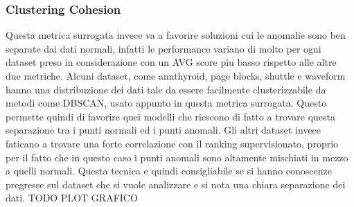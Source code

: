 \subsubsection{Clustering Cohesion}
Questa metrica surrogata invece va a favorire soluzioni cui le anomalie sono ben separate dai dati normali, infatti le performance variano di molto per ogni dataset preso in considerazione con un AVG score piu basso rispetto alle altre due metriche.
Alcuni dataset, come annthyroid, page blocks, shuttle e waveform hanno una distribuzione dei dati tale da essere facilmente clusterizzabile da metodi come DBSCAN, usato appunto in questa metrica surrogata. Questo permette quindi di favorire quei modelli che riescono di fatto a trovare questa separazione tra i punti normali ed i punti anomali.
Gli altri dataset invece faticano a trovare una forte correlazione con il ranking supervisionato, proprio per il fatto che in questo caso i punti anomali sono altamente mischiati in mezzo a quelli normali.
Questa tecnica e quindi consigliabile se si hanno conoscenze pregresse sul dataset che si vuole analizzare e si nota una chiara separazione dei dati.
TODO PLOT GRAFICO
